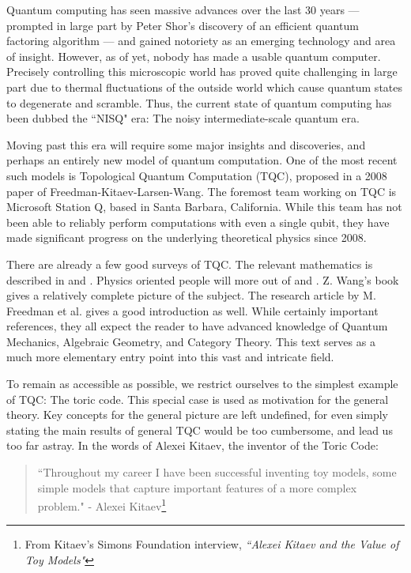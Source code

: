 \documentclass{article}
\theoremstyle{definition}
\numberwithin{figure}{section}
\begin{document}
Quantum computing has seen massive advances over the last 30 years — prompted in large part by Peter Shor's discovery of an efficient quantum factoring algorithm \cite{shor1994algorithms} — and gained notoriety as an emerging technology and area of insight. However, as of yet, nobody has made a usable quantum computer. Precisely controlling this microscopic world has proved quite challenging in large part due to thermal fluctuations of the outside world which cause quantum states to degenerate and scramble. Thus, the current state of quantum computing has been dubbed the ``NISQ" era: The noisy intermediate-scale quantum era.

Moving past this era will require some major insights and discoveries, and perhaps an entirely new model of quantum computation. One of the most recent such models is Topological Quantum Computation (TQC), proposed in a 2008 paper of Freedman-Kitaev-Larsen-Wang. The foremost team working on TQC is Microsoft Station Q, based in Santa Barbara, California. While this team has not been able to reliably perform computations with even a single qubit, they have made significant progress on the underlying theoretical physics since 2008.

There are already a few good surveys of TQC. The relevant mathematics is described in \cite{bakalov2001lectures} and  \cite{rowell2018mathematics}. Physics oriented people will more out of \cite{preskill1999lecture} and \cite{nayak2008non}. Z. Wang's book \cite{wang2010topological} gives a relatively complete picture of the subject. The research article by M. Freedman et al. \cite{freedman2002simulation} gives a good introduction as well. While certainly important references, they all expect the reader to have advanced knowledge of Quantum Mechanics, Algebraic Geometry, and Category Theory. This text serves as a much more elementary entry point into this vast and intricate field.

To remain as accessible as possible, we restrict ourselves to the simplest example of TQC: The toric code. This special case is used as motivation for the general theory. Key concepts for the general picture are left undefined, for even simply stating the main results of general TQC would be too cumbersome, and lead us too far astray. In the words of Alexei Kitaev, the inventor of the Toric Code:

\begin{quote}
``Throughout my career I have been successful inventing toy models, some simple models that capture important features of a more complex problem." - Alexei Kitaev\footnote{From Kitaev's Simons Foundation interview, \textit{``Alexei Kitaev and the Value of Toy Models"}}
\end{quote}
\end{document}
